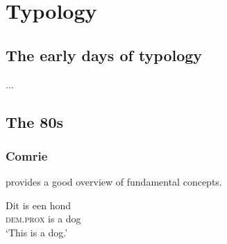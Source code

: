\chapter{Typology}
\section{The early days of typology}
 ...
\section{The 80s}
\subsection{Comrie}
\citet{Comrie1981} provides a good overview of fundamental concepts.

\ea                                              %
\gll Dit is een hond \\                          %
     \textsc{dem.prox} is a dog\\                %
\glt `This is a dog.'                            %
\z                                               %